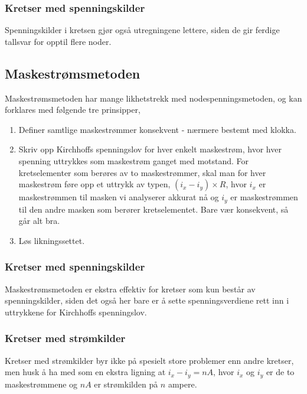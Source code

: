 \documentclass[norsk, a4paper, 12pt, twoside, titlepage]{article}
\begin{document}
\subsubsection{Kretser med spenningskilder}
Spenningskilder i kretsen gjør også utregningene lettere, siden de gir
ferdige tallsvar for opptil flere noder.

\subsection{Maskestrømsmetoden}
Maskestrømsmetoden har mange likhetstrekk med nodespenningsmetoden, og
kan forklares med følgende tre prinsipper,

\begin{enumerate}
\item Definer samtlige maskestrømmer konsekvent - nærmere bestemt med
  klokka.
\item Skriv opp Kirchhoffs spenningslov for hver enkelt maskestrøm,
  hvor hver spenning uttrykkes som maskestrøm ganget med motstand. For
  kretselementer som berøres av to maskestrømmer, skal man for hver
  maskestrøm føre opp et uttrykk av typen, $(i_{x} - i_{y}) \times R$,
  hvor $i_{x}$ er maskestrømmen til masken vi analyserer akkurat nå og
  $i_{y}$ er maskestrømmen til den andre masken som berører
  kretselementet.  Bare vær konsekvent, så går alt bra.
\item Løs likningssettet.
\end{enumerate}

\subsubsection{Kretser med spenningskilder}
Maskestrømsmetoden er ekstra effektiv for kretser som kun består av
spenningskilder, siden det også her bare er å sette spenningsverdiene
rett inn i uttrykkene for Kirchhoffs spenningslov.

\subsubsection{Kretser med strømkilder}
Kretser med strømkilder byr ikke på spesielt store problemer enn andre
kretser, men husk å ha med som en ekstra ligning at $i_{x} - i_{y} = n
A$, hvor $i_{x}$ og $i_{y}$ er de to maskestrømmene og $n A$ er
strømkilden på $n$ ampere.
\end{document}
